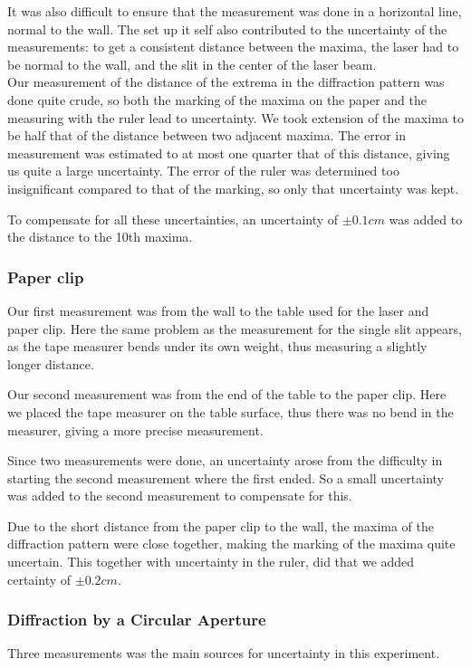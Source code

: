 \documentclass{emulateapj}
\begin{document}
It was also difficult to ensure that the measurement was done in a horizontal line, normal to the wall. The set up it self also contributed to the uncertainty of the measurements: to get a consistent distance between the maxima, the laser had to be normal to the wall, and the slit in the center of the laser beam. \\

Our measurement of the distance of the extrema in the diffraction pattern was done quite crude, so both the marking of the maxima on the paper and the measuring with the ruler lead to uncertainty. We took extension of the maxima to be half that of the distance between two adjacent maxima. The error in measurement was estimated to at most one quarter that of this distance, giving us quite a large uncertainty. The error of the ruler was determined too insignificant compared to that of the marking, so only that uncertainty was kept.

To compensate for all these uncertainties, an uncertainty of $\pm 0.1 cm$ was added to the distance to the 10th maxima.


\subsubsection{Paper clip}
Our first measurement was from the wall to the table used for the laser and paper clip. Here the same problem as the measurement for the single slit appears, as the tape measurer bends under its own weight, thus measuring a slightly longer distance. 

Our second measurement was from the end of the table to the paper clip. Here we placed the tape measurer on the table surface, thus there was no bend in the measurer, giving a more precise measurement. 

Since two measurements were done, an uncertainty arose from the difficulty in starting the second measurement where the first ended. So a small uncertainty was added to the second measurement to compensate for this.

Due to the short distance from the paper clip to the wall, the maxima of the diffraction pattern were close together, making the marking of the maxima quite uncertain. This together with uncertainty in the ruler, did that we added certainty of $\pm 0.2 cm$. 

\subsubsection{Diffraction by a Circular Aperture}
Three measurements was the main sources for uncertainty in this experiment.
\end{document}
